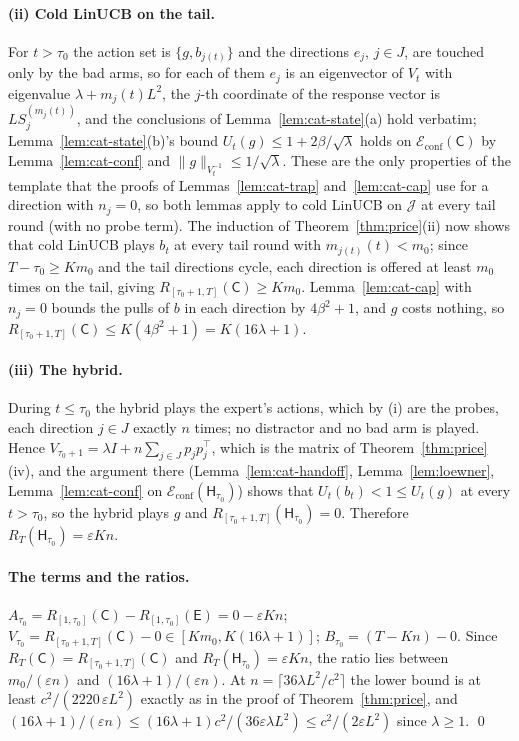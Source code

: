 \documentclass{article}
\theoremstyle{definition}
\theoremstyle{remark}
\newcommand{\eps}{\varepsilon}
\theoremstyle{remark}
\newcommand{\Cold}{\mathsf{C}}
\newcommand{\Exp}{\mathsf{E}}
\newcommand{\Hyb}{\mathsf{H}}
\begin{document}
\paragraph{(ii) Cold LinUCB on the tail.}
For $t>\tau_0$ the action set is $\{g,b_{j(t)}\}$ and the directions $e_j$,
$j\in J$, are touched only by the bad arms, so for each of them $e_j$ is an
eigenvector of $V_t$ with eigenvalue $\lambda+m_j(t)L^2$, the $j$-th
coordinate of the response vector is $LS_j^{(m_j(t))}$, and the conclusions of
Lemma~\ref{lem:cat-state}(a) hold verbatim; Lemma~\ref{lem:cat-state}(b)'s
bound $U_t(g)\le1+2\beta/\sqrt\lambda$ holds on $\mathcal E_{\mathrm{conf}}(\Cold)$
by Lemma~\ref{lem:cat-conf} and $\|g\|_{V_t^{-1}}\le1/\sqrt\lambda$. These are
the only properties of the template that the proofs of
Lemmas~\ref{lem:cat-trap} and~\ref{lem:cat-cap} use for a direction with
$n_j=0$, so both lemmas apply to cold LinUCB on $\mathcal J$ at every tail
round (with no probe term). The induction of Theorem~\ref{thm:price}(ii) now
shows that cold LinUCB plays $b_t$ at every tail round with $m_{j(t)}(t)<m_0$;
since $T-\tau_0\ge Km_0$ and the tail directions cycle, each direction is
offered at least $m_0$ times on the tail, giving $R_{[\tau_0+1,T]}(\Cold)\ge Km_0$.
Lemma~\ref{lem:cat-cap} with $n_j=0$ bounds the pulls of $b$ in each
direction by $4\beta^2+1$, and $g$ costs nothing, so
$R_{[\tau_0+1,T]}(\Cold)\le K(4\beta^2+1)=K(16\lambda+1)$.

\paragraph{(iii) The hybrid.}
During $t\le\tau_0$ the hybrid plays the expert's actions, which by (i) are
the probes, each direction $j\in J$ exactly $n$ times; no distractor and no
bad arm is played. Hence $V_{\tau_0+1}=\lambda I+n\sum_{j\in J}p_jp_j^\top$,
which is the matrix of Theorem~\ref{thm:price}(iv), and the argument there
(Lemma~\ref{lem:cat-handoff}, Lemma~\ref{lem:loewner}, Lemma~\ref{lem:cat-conf}
on $\mathcal E_{\mathrm{conf}}(\Hyb_{\tau_0})$) shows that
$U_t(b_t)<1\le U_t(g)$ at every $t>\tau_0$, so the hybrid plays $g$ and
$R_{[\tau_0+1,T]}(\Hyb_{\tau_0})=0$. Therefore $R_T(\Hyb_{\tau_0})=\eps Kn$.

\paragraph{The terms and the ratios.}
$A_{\tau_0}=R_{[1,\tau_0]}(\Cold)-R_{[1,\tau_0]}(\Exp)=0-\eps Kn$;
$V_{\tau_0}=R_{[\tau_0+1,T]}(\Cold)-0\in[Km_0,K(16\lambda+1)]$;
$B_{\tau_0}=(T-Kn)-0$. Since $R_T(\Cold)=R_{[\tau_0+1,T]}(\Cold)$ and
$R_T(\Hyb_{\tau_0})=\eps Kn$, the ratio lies between $m_0/(\eps n)$ and
$(16\lambda+1)/(\eps n)$. At $n=\lceil36\lambda L^2/c^2\rceil$ the lower bound
is at least $c^2/(2220\,\eps L^2)$ exactly as in the proof of
Theorem~\ref{thm:price}, and $(16\lambda+1)/(\eps n)\le(16\lambda+1)c^2/(36\eps\lambda L^2)\le c^2/(2\eps L^2)$
since $\lambda\ge1$. \qed
\end{document}
